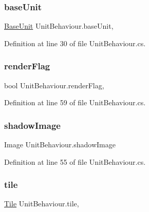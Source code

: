 \subsubsection{\texorpdfstring{baseUnit}{baseUnit}}
{\footnotesize\ttfamily \mbox{\hyperlink{class_base_unit}{Base\+Unit}} Unit\+Behaviour.\+base\+Unit\hspace{0.3cm}{\ttfamily [get]}, {\ttfamily [set]}}



Definition at line 30 of file Unit\+Behaviour.\+cs.

\mbox{\label{class_unit_behaviour_a967462055b4f06234aa94f867b162658}} 
\subsubsection{\texorpdfstring{renderFlag}{renderFlag}}
{\footnotesize\ttfamily bool Unit\+Behaviour.\+render\+Flag\hspace{0.3cm}{\ttfamily [get]}, {\ttfamily [set]}}



Definition at line 59 of file Unit\+Behaviour.\+cs.

\mbox{\label{class_unit_behaviour_a71c6dafe4e7e8c204bfa2a0c131a8f43}} 
\subsubsection{\texorpdfstring{shadowImage}{shadowImage}}
{\footnotesize\ttfamily Image Unit\+Behaviour.\+shadow\+Image\hspace{0.3cm}{\ttfamily [get]}}



Definition at line 55 of file Unit\+Behaviour.\+cs.

\mbox{\label{class_unit_behaviour_a88e52afa84a4a9615e6cba0d610af427}} 
\subsubsection{\texorpdfstring{tile}{tile}}
{\footnotesize\ttfamily \mbox{\hyperlink{class_tile}{Tile}} Unit\+Behaviour.\+tile\hspace{0.3cm}{\ttfamily [get]}, {\ttfamily [set]}}



